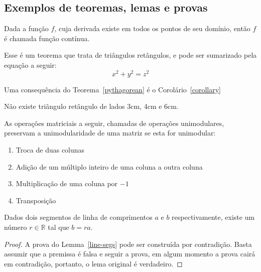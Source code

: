 \subsection{Exemplos de teoremas, lemas e provas}

\begin{theorem}
Dada a função $f$, cuja derivada existe em todos os pontos de seu domínio, então $f$ é chamada função contínua.
\end{theorem}

\begin{theorem}
\label{pythagorean}
Esse é um teorema que trata de triângulos retângulos, e pode ser sumarizado pela equação a seguir:
\[ x^2 + y^2 = z^2 \]
\end{theorem}

Uma consequência do Teorema~\ref{pythagorean} é o Corolário~\ref{corollary}

\begin{corollary}
\label{corollary}
Não existe triângulo retângulo de lados 3cm, 4cm e 6cm.
\end{corollary}

\begin{lemma}
  As operações matriciais a seguir, chamadas de operações unimodulares, preservam a unimodularidade de uma matriz se esta for unimodular:
\begin{enumerate}
    \item Troca de duas colunas
    \item Adição de um múltiplo inteiro de uma coluna a outra coluna
    \item Multiplicação de uma coluna por $-1$
    \item Transposição
\end{enumerate}
\end{lemma}

\begin{lemma}
\label{line-segs}
Dados dois segmentos de linha de comprimentos $a$ e $b$ respectivamente, existe um número $r \in \mathbb{R}$ tal que $b=ra$.
\end{lemma}

\begin{proof}
A prova do Lemma~\ref{line-segs} pode ser construída por contradição. Basta assumir que a premissa é falsa e seguir a prova, em algum momento a prova cairá em contradição, portanto, o lema original é verdadeiro.
\end{proof}

